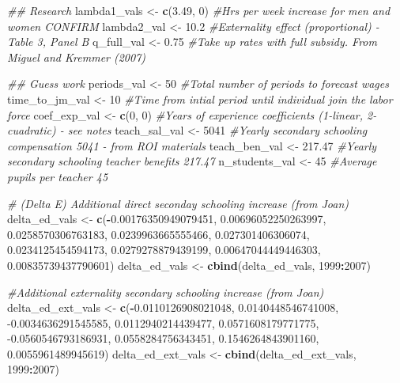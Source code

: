 \documentclass[]{article}
\newenvironment{Shaded}{\begin{snugshade}}{\end{snugshade}}
\newcommand{\CommentTok}[1]{\textcolor[rgb]{0.56,0.35,0.01}{\textit{#1}}}
\newcommand{\DecValTok}[1]{\textcolor[rgb]{0.00,0.00,0.81}{#1}}
\newcommand{\FloatTok}[1]{\textcolor[rgb]{0.00,0.00,0.81}{#1}}
\newcommand{\KeywordTok}[1]{\textcolor[rgb]{0.13,0.29,0.53}{\textbf{#1}}}
\newcommand{\NormalTok}[1]{#1}
\newcommand{\OperatorTok}[1]{\textcolor[rgb]{0.81,0.36,0.00}{\textbf{#1}}}
\newcommand{\StringTok}[1]{\textcolor[rgb]{0.31,0.60,0.02}{#1}}
\begin{document}
\begin{Shaded}
\begin{Highlighting}[]
    
\CommentTok{## Research   }
\NormalTok{lambda1_vals <-}\StringTok{ }\KeywordTok{c}\NormalTok{(}\FloatTok{3.49}\NormalTok{, }\DecValTok{0}\NormalTok{)      }\CommentTok{#Hrs per week increase for men and women CONFIRM}
\NormalTok{lambda2_val <-}\StringTok{ }\FloatTok{10.2}             \CommentTok{#Externality effect (proportional) - Table 3, Panel B}
\NormalTok{q_full_val <-}\StringTok{ }\FloatTok{0.75}              \CommentTok{#Take up rates with full subsidy. From Miguel and Kremmer (2007)}
    
\CommentTok{## Guess work   }
\NormalTok{periods_val <-}\StringTok{ }\DecValTok{50}               \CommentTok{#Total number of periods to forecast wages}
\NormalTok{time_to_jm_val <-}\StringTok{ }\DecValTok{10}            \CommentTok{#Time from intial period until individual join the labor force}
\NormalTok{coef_exp_val <-}\StringTok{ }\KeywordTok{c}\NormalTok{(}\DecValTok{0}\NormalTok{, }\DecValTok{0}\NormalTok{)         }\CommentTok{#Years of experience coefficients (1-linear, 2-cuadratic)   - see notes }
\NormalTok{teach_sal_val <-}\StringTok{ }\DecValTok{5041}           \CommentTok{#Yearly secondary schooling compensation    5041 - from ROI materials}
\NormalTok{teach_ben_val <-}\StringTok{ }\FloatTok{217.47}         \CommentTok{#Yearly secondary schooling teacher benefits    217.47}
\NormalTok{n_students_val <-}\StringTok{ }\DecValTok{45}            \CommentTok{#Average pupils per teacher 45}


\CommentTok{# (Delta E) Additional direct seconday schooling increase (from Joan)   }
\NormalTok{delta_ed_vals <-}\StringTok{ }\KeywordTok{c}\NormalTok{(}\OperatorTok{-}\FloatTok{0.00176350949079451}\NormalTok{, }\FloatTok{0.00696052250263997}\NormalTok{, }\FloatTok{0.0258570306763183}\NormalTok{, }
  \FloatTok{0.0239963665555466}\NormalTok{, }\FloatTok{0.027301406306074}\NormalTok{, }\FloatTok{0.0234125454594173}\NormalTok{, }\FloatTok{0.0279278879439199}\NormalTok{, }
  \FloatTok{0.00647044449446303}\NormalTok{, }\FloatTok{0.00835739437790601}\NormalTok{)                                     }
\NormalTok{delta_ed_vals <-}\StringTok{ }\KeywordTok{cbind}\NormalTok{(delta_ed_vals, }\DecValTok{1999}\OperatorTok{:}\DecValTok{2007}\NormalTok{)}

\CommentTok{#Additional externality secondary schooling increase (from Joan)}
\NormalTok{delta_ed_ext_vals <-}\StringTok{ }\KeywordTok{c}\NormalTok{(}\OperatorTok{-}\FloatTok{0.0110126908021048}\NormalTok{, }\FloatTok{0.0140448546741008}\NormalTok{, }\FloatTok{-0.0034636291545585}\NormalTok{,}
                       \FloatTok{0.0112940214439477}\NormalTok{,  }\FloatTok{0.0571608179771775}\NormalTok{, }\FloatTok{-0.0560546793186931}\NormalTok{,}
                       \FloatTok{0.0558284756343451}\NormalTok{,  }\FloatTok{0.1546264843901160}\NormalTok{, }\FloatTok{0.0055961489945619}\NormalTok{)}
\NormalTok{delta_ed_ext_vals <-}\StringTok{ }\KeywordTok{cbind}\NormalTok{(delta_ed_ext_vals, }\DecValTok{1999}\OperatorTok{:}\DecValTok{2007}\NormalTok{)}


\end{Highlighting}
\end{Shaded}
\end{document}
